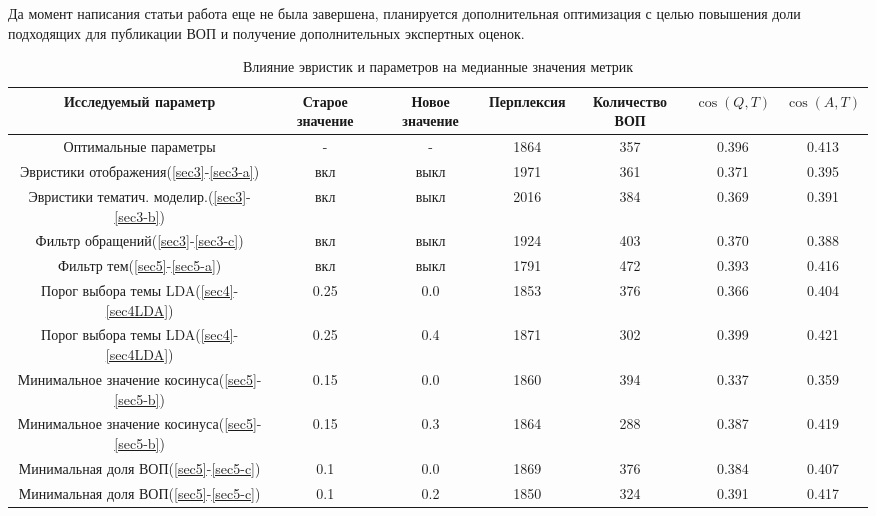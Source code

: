 Да момент написания статьи работа еще не была завершена, планируется дополнительная оптимизация с целью повышения доли подходящих для публикации ВОП и получение дополнительных экспертных оценок.
\begin{landscape}
\begin{table*}[t]
  \caption{Влияние эвристик и параметров на медианные значения метрик}
  \label{quality}
  \centering
  \begin{tabular}{|c|c|c||c|c|c|c|}
     \hline
      \parbox[t]{3cm}{\textbf{Исследуемый параметр}} &%
     \parbox[t]{2cm}{\textbf{Старое значение}} &%
     \parbox[t]{1.7cm}{\textbf{Новое значение}} &%
     \textbf{Перплексия} &%
     \parbox[t]{2cm}{\textbf{Количество ВОП}} &%
     \textbf{$\cos(Q,T)$} &%
     \textbf{$\cos(A,T)$} \\
	 \hline
     \parbox[t]{2.7cm}{Оптимальные параметры} &%
     - &%
     - &%
	 1864 &%
     357 &%
 	 0.396 &%
     0.413 \\
  	 \hline
     \parbox[t]{3cm}{Эвристики отображения(\ref{sec3}-\ref{sec3-a})} &%
     вкл &%
     выкл &%
	 1971 &%
     361 &%
 	 0.371 &%
     0.395 \\
	 \hline
	 \parbox[t]{3cm}{Эвристики тематич. моделир.(\ref{sec3}-\ref{sec3-b})} &%
     вкл &%
     выкл &%
	 2016 &%
     384 &%
 	 0.369 &%
     0.391 \\
	 \hline
\parbox[t]{3cm}{Фильтр обращений(\ref{sec3}-\ref{sec3-c})} &%
     вкл &%
     выкл &%
	 1924 &%
     403 &%
 	 0.370 &%
     0.388 \\
	 \hline
\parbox[t]{3cm}{Фильтр тем(\ref{sec5}-\ref{sec5-a})} &%
     вкл &%
     выкл &%
	 1791 &%
     472 &%
 	 0.393 &%
     0.416 \\
     \hline
\parbox[t]{2.7cm}{Порог выбора темы LDA(\ref{sec4}-\ref{sec4LDA})} &%
     0.25 &%
     0.0 &%
	 1853 &%
     376 &%
 	 0.366 &%
     0.404 \\
     \hline
\parbox[t]{2.7cm}{Порог выбора темы LDA(\ref{sec4}-\ref{sec4LDA})} &%
     0.25 &%
     0.4 &%
	 1871 &%
     302 &%
 	 0.399 &%
     0.421 \\
     \hline
\parbox[t]{3cm}{Минимальное значение косинуса(\ref{sec5}-\ref{sec5-b})} &%
     0.15 &%
     0.0 &%
	 1860 &%
     394 &%
 	 0.337 &%
     0.359 \\
     \hline
\parbox[t]{3cm}{Минимальное значение косинуса(\ref{sec5}-\ref{sec5-b})} &%
     0.15 &%
     0.3 &%
	 1864 &%
     288 &%
 	 0.387 &%
     0.419 \\
     \hline         
\parbox[t]{3cm}{Минимальная доля ВОП(\ref{sec5}-\ref{sec5-c})} &%
     0.1 &%
     0.0 &%
	 1869 &%
     376 &%
 	 0.384 &%
     0.407 \\
     \hline
\parbox[t]{3cm}{Минимальная доля ВОП(\ref{sec5}-\ref{sec5-c})} &%
     0.1 &%
     0.2 &%
	 1850 &%
     324 &%
 	 0.391 &%
     0.417 \\
     \hline     
  \end{tabular}

\end{table*}
\end{landscape}

